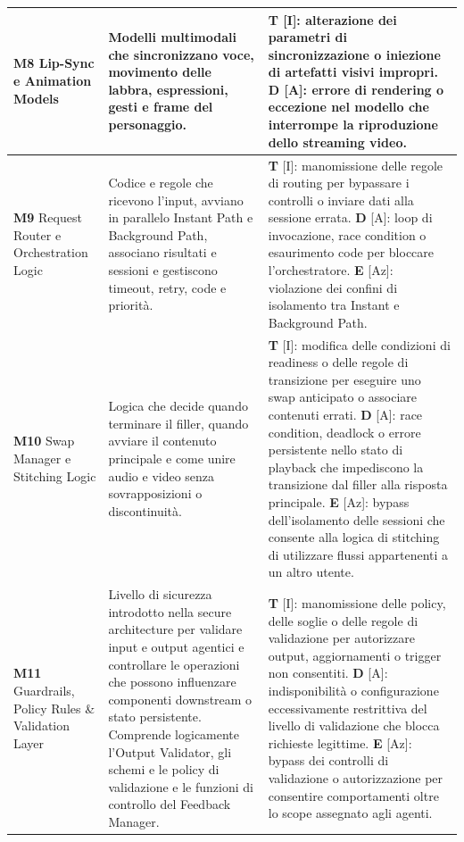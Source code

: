 \documentclass[11pt,a4paper]{article}
\begin{document}
\begin{longtable}{|C{2.8cm}|L{4.2cm}|L{\dimexpr\textwidth-2.8cm-4.2cm-6\arrayrulewidth\relax}|}
\textbf{M8} \newline Lip-Sync e Animation Models & 
Modelli multimodali che sincronizzano voce, movimento delle labbra, espressioni, gesti e frame del personaggio. & 
\textbf{T} [I]: alterazione dei parametri di sincronizzazione o iniezione di artefatti visivi impropri. \newline \textbf{D} [A]: errore di rendering o eccezione nel modello che interrompe la riproduzione dello streaming video. \\
\hline

\textbf{M9} \newline Request Router e Orchestration Logic & 
Codice e regole che ricevono l'input, avviano in parallelo Instant Path e Background Path, associano risultati e sessioni e gestiscono timeout, retry, code e priorità. & 
\textbf{T} [I]: manomissione delle regole di routing per bypassare i controlli o inviare dati alla sessione errata. \newline \textbf{D} [A]: loop di invocazione, race condition o esaurimento code per bloccare l'orchestratore. \newline \textbf{E} [Az]: violazione dei confini di isolamento tra Instant e Background Path. \\
\hline

\textbf{M10} \newline Swap Manager e Stitching Logic & 
Logica che decide quando terminare il filler, quando avviare il contenuto principale e come unire audio e video senza sovrapposizioni o discontinuità. & 
\textbf{T} [I]: modifica delle condizioni di readiness o delle regole di transizione per eseguire uno swap anticipato o associare contenuti errati. \newline \textbf{D} [A]: race condition, deadlock o errore persistente nello stato di playback che impediscono la transizione dal filler alla risposta principale. \newline \textbf{E} [Az]: bypass dell'isolamento delle sessioni che consente alla logica di stitching di utilizzare flussi appartenenti a un altro utente. \\
\hline

\textbf{M11} \newline Guardrails, Policy Rules \& Validation Layer &
Livello di sicurezza introdotto nella secure architecture per validare
input e output agentici e controllare le operazioni che possono
influenzare componenti downstream o stato persistente. Comprende
logicamente l'Output Validator, gli schemi e le policy di validazione e
le funzioni di controllo del Feedback Manager. &
\textbf{T} [I]: manomissione delle policy, delle soglie o delle regole
di validazione per autorizzare output, aggiornamenti o trigger non
consentiti. \newline
\textbf{D} [A]: indisponibilità o configurazione eccessivamente
restrittiva del livello di validazione che blocca richieste legittime.
\newline
\textbf{E} [Az]: bypass dei controlli di validazione o autorizzazione
per consentire comportamenti oltre lo scope assegnato agli agenti. \\
\hline


\end{longtable}
\end{document}
